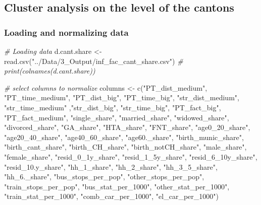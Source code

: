 \documentclass[
]{article}
\newenvironment{Shaded}{\begin{snugshade}}{\end{snugshade}}
\newcommand{\CommentTok}[1]{\textcolor[rgb]{0.56,0.35,0.01}{\textit{#1}}}
\newcommand{\FunctionTok}[1]{\textcolor[rgb]{0.00,0.00,0.00}{#1}}
\newcommand{\NormalTok}[1]{#1}
\newcommand{\OtherTok}[1]{\textcolor[rgb]{0.56,0.35,0.01}{#1}}
\newcommand{\StringTok}[1]{\textcolor[rgb]{0.31,0.60,0.02}{#1}}
\begin{document}
\hypertarget{cluster-analysis-on-the-level-of-the-cantons}{%
\subsection{Cluster analysis on the level of the
cantons}\label{cluster-analysis-on-the-level-of-the-cantons}}

\hypertarget{loading-and-normalizing-data}{%
\subsubsection{Loading and normalizing
data}\label{loading-and-normalizing-data}}

\begin{Shaded}
\begin{Highlighting}[]
\CommentTok{\# Loading data}
\NormalTok{d.cant.share }\OtherTok{\textless{}{-}} \FunctionTok{read.csv}\NormalTok{(}\StringTok{"../Data/3\_Output/inf\_fac\_cant\_share.csv"}\NormalTok{)}
\CommentTok{\# print(colnames(d.cant.share))}

\CommentTok{\# select columns to normalize}
\NormalTok{columns }\OtherTok{\textless{}{-}} \FunctionTok{c}\NormalTok{(}\StringTok{"PT\_dist\_medium"}\NormalTok{, }\StringTok{"PT\_time\_medium"}\NormalTok{, }\StringTok{"PT\_dist\_big"}\NormalTok{, }\StringTok{"PT\_time\_big"}\NormalTok{,}
             \StringTok{"str\_dist\_medium"}\NormalTok{, }\StringTok{"str\_time\_medium"}\NormalTok{ ,}\StringTok{"str\_dist\_big"}\NormalTok{, }\StringTok{"str\_time\_big"}\NormalTok{,}
             \StringTok{"PT\_fact\_big"}\NormalTok{, }\StringTok{"PT\_fact\_medium"}\NormalTok{, }\StringTok{"single\_share"}\NormalTok{, }\StringTok{"married\_share"}\NormalTok{, }
             \StringTok{"widowed\_share"}\NormalTok{, }\StringTok{"divorced\_share"}\NormalTok{, }\StringTok{"GA\_share"}\NormalTok{, }\StringTok{"HTA\_share"}\NormalTok{,}
             \StringTok{"FNT\_share"}\NormalTok{, }\StringTok{"age0\_20\_share"}\NormalTok{, }\StringTok{"age20\_40\_share"}\NormalTok{, }\StringTok{"age40\_60\_share"}\NormalTok{,}
             \StringTok{"age60.\_share"}\NormalTok{, }\StringTok{"birth\_munic\_share"}\NormalTok{, }\StringTok{"birth\_cant\_share"}\NormalTok{, }
             \StringTok{"birth\_CH\_share"}\NormalTok{, }\StringTok{"birth\_notCH\_share"}\NormalTok{, }\StringTok{"male\_share"}\NormalTok{, }\StringTok{"female\_share"}\NormalTok{,}
             \StringTok{"resid\_0\_1y\_share"}\NormalTok{, }\StringTok{"resid\_1\_5y\_share"}\NormalTok{, }\StringTok{"resid\_6\_10y\_share"}\NormalTok{, }
             \StringTok{"resid\_10.y\_share"}\NormalTok{, }\StringTok{"hh\_1\_share"}\NormalTok{, }\StringTok{"hh\_2\_share"}\NormalTok{, }\StringTok{"hh\_3\_5\_share"}\NormalTok{, }
             \StringTok{"hh\_6.\_share"}\NormalTok{, }\StringTok{"bus\_stops\_per\_pop"}\NormalTok{, }\StringTok{"other\_stops\_per\_pop"}\NormalTok{, }
             \StringTok{"train\_stops\_per\_pop"}\NormalTok{, }\StringTok{"bus\_stat\_per\_1000"}\NormalTok{, }\StringTok{"other\_stat\_per\_1000"}\NormalTok{,}
             \StringTok{"train\_stat\_per\_1000"}\NormalTok{, }\StringTok{"comb\_car\_per\_1000"}\NormalTok{, }\StringTok{"el\_car\_per\_1000"}\NormalTok{)}


\end{Highlighting}
\end{Shaded}
\end{document}
